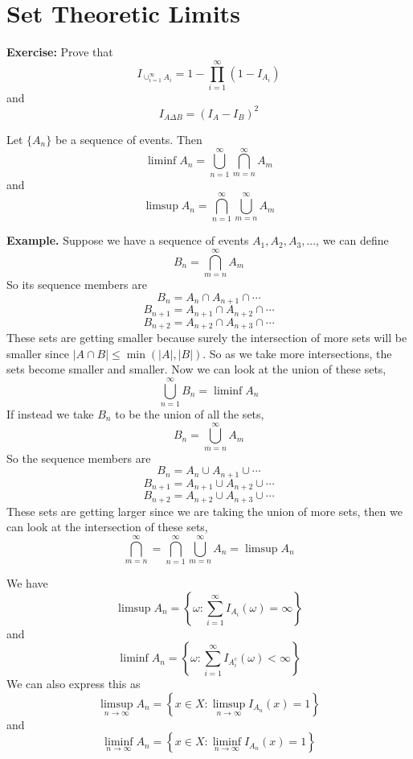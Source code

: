 \section{Set Theoretic Limits}
\textbf{Exercise:} Prove that
\[I_{\cup_{i=1}^\infty A_i} = 1 - \prod_{i=1}^\infty(1 - I_{A_i})\]
and 
\[I_{A \Delta B}= (I_A - I_B)^2\]
\begin{definition}
    Let $\{A_n\}$ be a sequence of events. Then 
    \[\liminf A_n = \bigcup_{n=1}^\infty \bigcap_{m=n}^\infty A_m\]
    and
    \[\limsup A_n = \bigcap_{n=1}^\infty \bigcup_{m=n}^\infty A_m\]
\end{definition}
\noindent
\textbf{Example.} Suppose we have a sequence of events $A_1, A_2, A_3, \ldots$, we can define 
\[B_n = \bigcap_{m=n}^\infty A_m\]
So its sequence members are 
\[B_n = A_n \cap A_{n+1} \cap \cdots\]
\[B_{n+1} = A_{n+1} \cap A_{n+2} \cap \cdots\]
\[B_{n+2} = A_{n+2} \cap A_{n+3} \cap \cdots\]
These sets are getting smaller because surely the intersection of more sets will be smaller since $|A \cap B| \leq \min(|A|, |B|)$. So as we take more intersections, the sets become smaller and smaller. Now we can look at the union of these sets, 
\[\bigcup_{n=1}^\infty B_n = \liminf A_n\]
If instead we take $B_n$ to be the union of all the sets, 
\[B_n = \bigcup_{m=n}^\infty A_m\]
So the sequence members are 
\[B_n = A_n \cup A_{n+1} \cup \cdots\]
\[B_{n+1} = A_{n+1} \cup A_{n+2} \cup \cdots\]
\[B_{n+2} = A_{n+2} \cup A_{n+3} \cup \cdots\]
These sets are getting larger since we are taking the union of more sets, then we can look at the intersection of these sets,
\[\bigcap_{m=n}^\infty = \bigcap_{n=1}^\infty \bigcup_{m=n}^\infty A_n = \limsup A_n\]
\begin{lemma}
    We have 
    \[\limsup A_n = \left\{\omega: \sum_{i=1}^\infty I_{A_i}(\omega) = \infty \right\}\]
    and 
    \[\liminf A_n = \left\{\omega: \sum_{i=1}^\infty I_{A_i^c}(\omega) < \infty \right\}\]
    We can also express this as 
    \[\limsup_{n\rightarrow\infty} A_n = \left\{x \in X : \limsup_{n\rightarrow \infty} I_{A_n}(x) = 1\right\}\]
    and 
    \[\liminf_{n\rightarrow\infty} A_n = \left\{x \in X : \liminf_{n\rightarrow \infty} I_{A_n}(x) = 1\right\}\]
\end{lemma}

